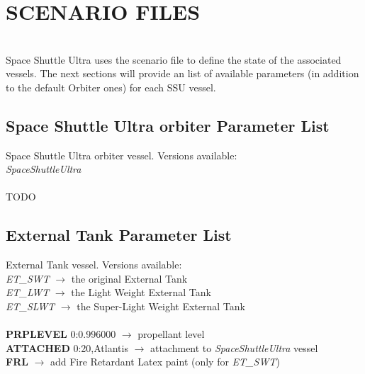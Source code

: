 \documentclass[Space_Shuttle_Ultra_Manual.tex]{subfiles}
\begin{document}
\section{SCENARIO FILES}
\begin{multicols*}{2}
\label{sec:scenario-files}
\renewcommand{\cfttoctitlefont}{\bf}
\localtableofcontents
\noindent
\\
Space Shuttle Ultra uses the scenario file to define the state of the associated vessels. The next sections will provide an list of available parameters (in addition to the default Orbiter ones) for each SSU vessel.
\end{multicols*}

\begin{multicols*}{2}
\subsection{Space Shuttle Ultra orbiter Parameter List}
\noindent
Space Shuttle Ultra orbiter vessel. Versions available:
\\
\textit{SpaceShuttleUltra}
\\
\\
TODO
\\

\subsection{External Tank Parameter List}
\noindent
External Tank vessel. Versions available:
\\
\textit{ET\_SWT} $\rightarrow$ the original External Tank
\\
\textit{ET\_LWT} $\rightarrow$ the Light Weight External Tank
\\
\textit{ET\_SLWT} $\rightarrow$ the Super-Light Weight External Tank
\\
\\
\textbf{PRPLEVEL} 0:0.996000 $\rightarrow$ propellant level
\\
\textbf{ATTACHED} 0:20,Atlantis $\rightarrow$ attachment to \textit{SpaceShuttleUltra} vessel
\\
\textbf{FRL} $\rightarrow$ add Fire Retardant Latex paint (only for \textit{ET\_SWT})
\\


\end{multicols*}
\end{document}
